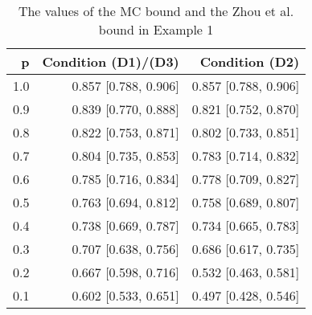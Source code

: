 \begin{table}

\caption{\label{tab:tab1}The values of the MC bound and the Zhou et al. bound in Example 1}
\centering
\begin{tabular}[t]{rrr}
\toprule
p & Condition (D1)/(D3) & Condition (D2)\\
\midrule
1.0 & 0.857 [0.788, 0.906] & 0.857 [0.788, 0.906]\\
0.9 & 0.839 [0.770, 0.888] & 0.821 [0.752, 0.870]\\
0.8 & 0.822 [0.753, 0.871] & 0.802 [0.733, 0.851]\\
0.7 & 0.804 [0.735, 0.853] & 0.783 [0.714, 0.832]\\
0.6 & 0.785 [0.716, 0.834] & 0.778 [0.709, 0.827]\\
0.5 & 0.763 [0.694, 0.812] & 0.758 [0.689, 0.807]\\
0.4 & 0.738 [0.669, 0.787] & 0.734 [0.665, 0.783]\\
0.3 & 0.707 [0.638, 0.756] & 0.686 [0.617, 0.735]\\
0.2 & 0.667 [0.598, 0.716] & 0.532 [0.463, 0.581]\\
0.1 & 0.602 [0.533, 0.651] & 0.497 [0.428, 0.546]\\
\bottomrule
\end{tabular}
\end{table}
